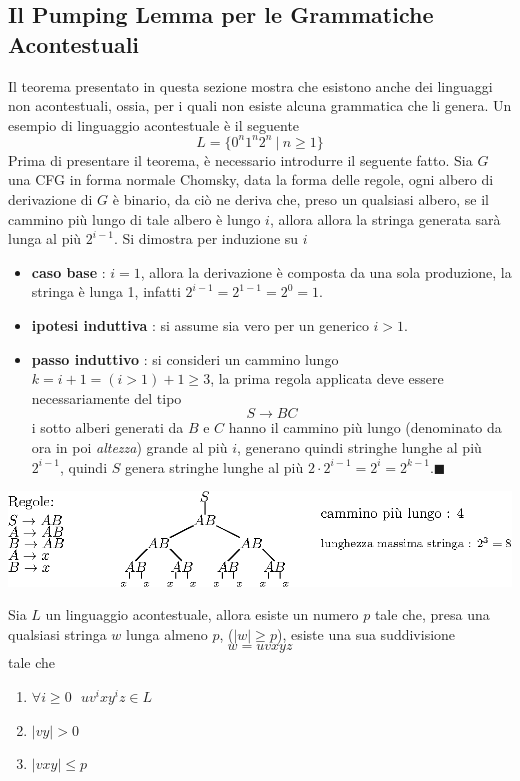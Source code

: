 \documentclass[10pt, letterpaper]{report}
\begin{document}
\subsection{Il Pumping Lemma per le Grammatiche Acontestuali} 
Il teorema presentato in questa sezione mostra che esistono anche dei linguaggi non acontestuali, ossia, per i quali non 
esiste alcuna grammatica che li genera. Un esempio di linguaggio acontestuale è il seguente 
$$ L=\{0^n1^n2^n\ | \ n\ge 1\}$$
Prima di presentare il teorema, è necessario introdurre il seguente fatto.\acc
\claim{} Sia $G$ una CFG in forma normale Chomsky, data la forma delle regole, ogni 
albero di derivazione di $G$ è binario, da ciò ne deriva che, preso un qualsiasi albero, se il cammino 
più lungo di tale albero è lungo $i$, allora  allora la stringa generata sarà 
lunga al più $2^{i-1}$.\acc 
{} Si dimostra per induzione su $i$\begin{itemize}
    \item \textbf{caso base} : $i=1$, allora la derivazione è composta da una sola produzione, la stringa 
    è lunga 1, infatti $2^{i-1}=2^{1-1}=2^0=1$. 
    \item \textbf{ipotesi induttiva} : si assume sia vero per un generico $i>1$. 
    \item \textbf{passo induttivo} : si consideri un cammino lungo $k=i+1 =  (i>1)+1 \ge 3$, la prima regola applicata 
    deve essere necessariamente del tipo $$S\longrightarrow BC$$ i sotto alberi generati da $B$ e $C$ hanno il 
    cammino più lungo (denominato da ora in poi \textit{altezza}) grande al più $i$, generano quindi stringhe 
    lunghe al più $2^{i-1}$, quindi $S$ genera stringhe lunghe al più $2\cdot 2^{i-1}=2^i=2^{k-1}$.\hfill$\blacksquare$
\end{itemize}
\begin{center}
    \includegraphics[width=\textwidth ]{images/altezzaAlberoDerivazione.eps}
\end{center}
  Sia $L$ un linguaggio acontestuale, allora esiste un numero $p$ tale che, presa 
una qualsiasi stringa $w$ lunga almeno $p$, ($|w|\ge p$), esiste una sua suddivisione $$w=uvxyz$$ tale che\begin{enumerate}
    \item $\forall i\ge 0 \ \ \ uv^ixy^iz\in L$
    \item $|vy|>0$
    \item $|vxy|\le p$
\end{enumerate}
\end{document}
